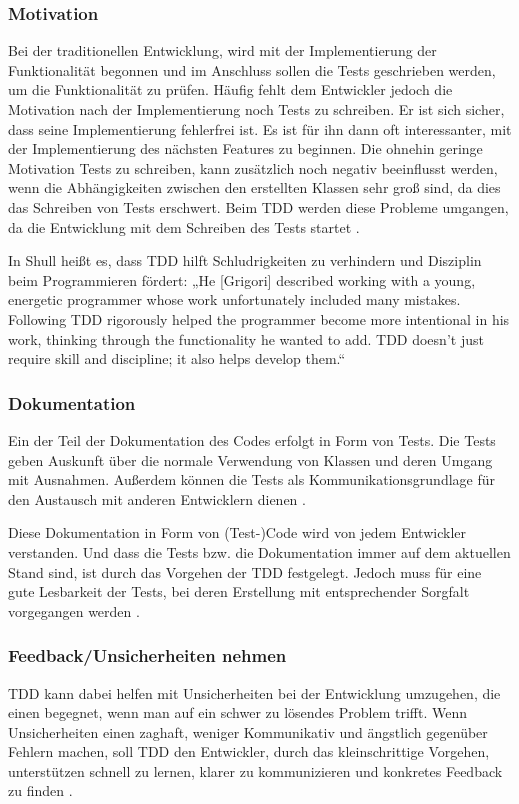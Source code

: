 \subsubsection{Motivation} Bei der traditionellen Entwicklung, wird mit der Implementierung der Funktionalität begonnen und im Anschluss sollen die Tests geschrieben werden, um die Funktionalität zu prüfen. Häufig fehlt dem Entwickler jedoch die Motivation nach der Implementierung noch Tests zu schreiben. Er ist sich sicher, dass seine Implementierung fehlerfrei ist. Es ist für ihn dann oft interessanter, mit der Implementierung des nächsten Features zu beginnen. Die ohnehin geringe Motivation Tests zu schreiben, kann zusätzlich noch negativ beeinflusst werden, wenn die Abhängigkeiten zwischen den erstellten Klassen sehr groß sind, da dies das Schreiben von Tests erschwert. Beim TDD werden diese Probleme umgangen, da die Entwicklung mit dem Schreiben des Tests startet \cite{Link2005SoftwaretestsEntwicklung}.

In Shull \cite[S. 17]{Shull2010WhatDevelopment} heißt es, dass TDD hilft Schludrigkeiten zu verhindern und Disziplin beim Programmieren fördert: „He [Grigori] described working with a young, energetic programmer whose work unfortunately included many mistakes. Following TDD rigorously helped the programmer become more intentional in his work, thinking through the functionality he wanted to add. TDD doesn’t just require skill and discipline; it also helps develop them.“

\subsubsection{Dokumentation} Ein der Teil der Dokumentation des Codes erfolgt in Form von Tests. Die Tests geben Auskunft über die normale Verwendung von Klassen und deren Umgang mit Ausnahmen. Außerdem können die Tests als Kommunikationsgrundlage für den Austausch mit anderen Entwicklern dienen \cite{Link2005SoftwaretestsEntwicklung, Martin2007ProfessionalismDevelopment}.

Diese Dokumentation in Form von (Test-)Code wird von jedem Entwickler verstanden. Und dass die Tests bzw. die Dokumentation immer auf dem aktuellen Stand sind, ist durch das Vorgehen der TDD festgelegt. Jedoch muss für eine gute Lesbarkeit der Tests, bei deren Erstellung mit entsprechender Sorgfalt vorgegangen werden \cite{Martin2007ProfessionalismDevelopment}.

\subsubsection{Feedback/Unsicherheiten nehmen} TDD kann dabei helfen mit Unsicherheiten bei der Entwicklung umzugehen, die einen begegnet, wenn man auf ein schwer zu lösendes Problem trifft. Wenn Unsicherheiten einen zaghaft, weniger Kommunikativ und ängstlich gegenüber Fehlern machen, soll TDD den Entwickler, durch das kleinschrittige Vorgehen, unterstützen schnell zu lernen, klarer zu kommunizieren und konkretes Feedback zu finden \cite{Beck2003TestExample}.

